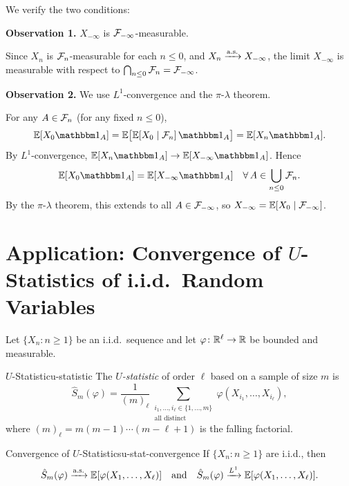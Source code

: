 We verify the two conditions:

\textbf{Observation 1.} $X_{-\infty}$ is $\mathcal{F}_{-\infty}$-measurable.

Since $X_n$ is $\mathcal{F}_n$-measurable for each $n \leq 0$, and $X_n \xrightarrow{\text{a.s.}} X_{-\infty}$, the limit $X_{-\infty}$ is measurable with respect to $\bigcap_{n \leq 0} \mathcal{F}_n = \mathcal{F}_{-\infty}$.

\textbf{Observation 2.} We use $L^1$-convergence and the $\pi$-$\lambda$ theorem.

For any $A \in \mathcal{F}_n$ (for any fixed $n \leq 0$),
\[
    \E[X_0 \ind_A] = \E\bigl[\E[X_0 \mid \F_n]\,\ind_A\bigr] = \E[X_n \ind_A].
\]
By $L^1$-convergence, $\E[X_n \ind_A] \to \E[X_{-\infty} \ind_A]$. Hence
\[
    \E[X_0 \ind_A] = \E[X_{-\infty} \ind_A] \quad \forall\, A \in \bigcup_{n \leq 0} \F_n.
\]
By the $\pi$-$\lambda$ theorem, this extends to all $A \in \mathcal{F}_{-\infty}$, so $X_{-\infty} = \mathbb{E}[X_0 \mid \mathcal{F}_{-\infty}]$.

\section{Application: Convergence of \texorpdfstring{$U$}{U}-Statistics of i.i.d.\ Random Variables}

Let $\{X_n : n \geq 1\}$ be an i.i.d.\ sequence and let $\varphi \colon \mathbb{R}^\ell \to \mathbb{R}$ be bounded and measurable.

\begin{definition}{\texorpdfstring{$U$}{U}-Statistic}{u-statistic}
    The \emph{$U$-statistic} of order $\ell$ based on a sample of size $m$ is
    \[
        \hat{S}_m(\varphi) = \frac{1}{(m)_\ell} \sum_{\substack{i_1, \ldots, i_\ell \in \{1, \ldots, m\} \\ \text{all distinct}}} \varphi(X_{i_1}, \ldots, X_{i_\ell}),
    \]
    where $(m)_\ell = m(m-1)\cdots(m - \ell + 1)$ is the falling factorial.
\end{definition}

\begin{theorem}{Convergence of \texorpdfstring{$U$}{U}-Statistics}{u-stat-convergence}
    If $\{X_n : n \geq 1\}$ are i.i.d., then
    \[
        \hat{S}_m(\varphi) \xrightarrow{\text{a.s.}} \mathbb{E}[\varphi(X_1, \ldots, X_\ell)] \quad \text{and} \quad \hat{S}_m(\varphi) \xrightarrow{L^{1}} \mathbb{E}[\varphi(X_1, \ldots, X_\ell)].
    \]
\end{theorem}

